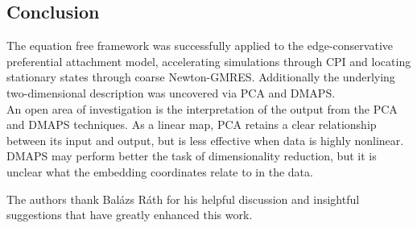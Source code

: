 \documentclass[epjST, final]{svjour}
\begin{document}
\begin{onehalfspace}
\section{Conclusion}

The equation free framework was successfully applied to the edge-conservative preferential attachment model, accelerating simulations through CPI and locating stationary states through coarse Newton-GMRES. Additionally the underlying two-dimensional description was uncovered via PCA and DMAPS. \\

An open area of investigation is the interpretation of the output from the PCA and DMAPS techniques. As a linear map, PCA retains a clear relationship between its input and output, but is less effective when data is highly nonlinear. DMAPS may perform better the task of dimensionality reduction, but it is unclear what the embedding coordinates relate to in the data.


 


\begin{acknowledgement}
The authors thank Bal\'{a}zs R\'{a}th for his helpful discussion and
insightful suggestions that have greatly enhanced this work.
\end{acknowledgement}

\end{onehalfspace}



\end{document}
